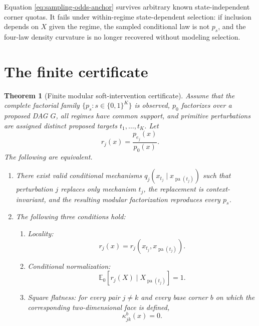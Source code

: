 \documentclass[11pt]{article}
\newtheorem{theorem}{Theorem}[section]
\newcommand{\E}{\mathbb{E}}
\newcommand{\pa}{\operatorname{pa}}
\begin{document}
Equation \eqref{eq:sampling-odds-anchor} survives arbitrary known state-independent corner quotas.  It fails under within-regime state-dependent selection: if inclusion depends on \(X\) given the regime, the sampled conditional law is not \(p_s\), and the four-law density curvature is no longer recovered without modeling selection.

\section{The finite certificate}

\begin{theorem}[Finite modular soft-intervention certificate]
\label{thm:certificate}
Assume that the complete factorial family \(\{p_s:s\in\{0,1\}^K\}\) is observed, \(p_0\) factorizes over a proposed DAG \(G\), all regimes have common support, and primitive perturbations are assigned distinct proposed targets \(t_1,\ldots,t_K\).  Let
\begin{equation}
r_j(x)=\frac{p_{e_j}(x)}{p_0(x)}.
\end{equation}
The following are equivalent.

\begin{enumerate}[label=(\Alph*)]
\item There exist valid conditional mechanisms \(q_j(x_{t_j}\mid x_{\pa(t_j)})\) such that perturbation \(j\) replaces only mechanism \(t_j\), the replacement is context-invariant, and the resulting modular factorization reproduces every \(p_s\).

\item The following three conditions hold:
\begin{enumerate}[label=(\roman*)]
\item \emph{Locality:}
\begin{equation}
r_j(x)=r_j(x_{t_j},x_{\pa(t_j)}).
\end{equation}
\item \emph{Conditional normalization:}
\begin{equation}
\E_0[r_j(X)\mid X_{\pa(t_j)}]=1.
\end{equation}
\item \emph{Square flatness:} for every pair \(j\ne k\) and every base corner \(b\) on which the corresponding two-dimensional face is defined,
\begin{equation}
\kappa_{jk}^b(x)=0.
\end{equation}
\end{enumerate}
\end{enumerate}
\end{theorem}
\end{document}
